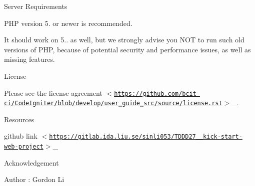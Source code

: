  Server Requirements 



P\+HP version 5. or newer is recommended.

It should work on 5.. as well, but we strongly advise you N\+OT to run such old versions of P\+HP, because of potential security and performance issues, as well as missing features.



 License 



Please see the {\ttfamily license agreement $<$\href{https://github.com/bcit-ci/CodeIgniter/blob/develop/user_guide_src/source/license.rst}{\tt https\+://github.\+com/bcit-\/ci/\+Code\+Igniter/blob/develop/user\+\_\+guide\+\_\+src/source/license.\+rst}$>$}\+\_\+.



 Resources 




\begin{DoxyItemize}
\item {\ttfamily github link $<$\href{https://gitlab.ida.liu.se/sinli053/TDDD27_2018_kick-start-web-project}{\tt https\+://gitlab.\+ida.\+liu.\+se/sinli053/\+T\+D\+D\+D27\+\_\+\_\+kick-\/start-\/web-\/project}$>$}\+\_\+
\end{DoxyItemize}



 Acknowledgement 



Author \+: Gordon Li 